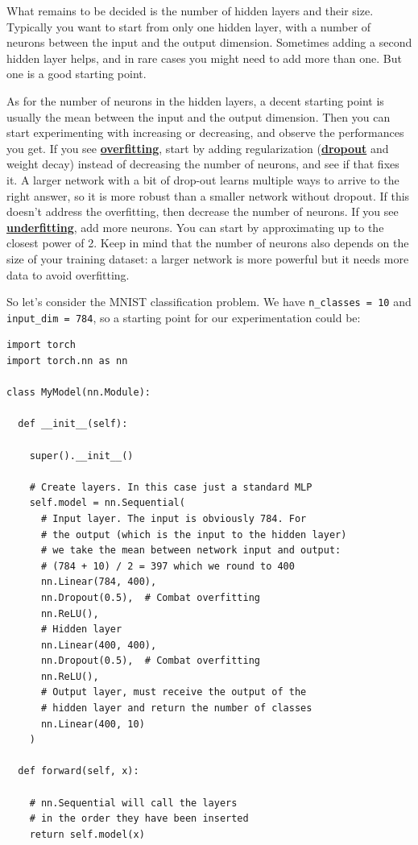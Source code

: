 What remains to be decided is the number of hidden layers and their size. Typically you want to start from only one hidden layer, with a number of neurons between the input and the output dimension. Sometimes adding a second hidden layer helps, and in rare cases you might need to add more than one. But one is a good starting point. \newline

As for the number of neurons in the hidden layers, a decent starting point is usually the mean between the input and the output dimension. Then you can start experimenting with increasing or decreasing, and observe the performances you get. If you see \href{https://en.wikipedia.org/wiki/Overfitting}{\textbf{overfitting}}, start by adding regularization (\href{https://pytorch.org/docs/stable/generated/torch.nn.Dropout.html}{\textbf{dropout}} and weight decay) instead of decreasing the number of neurons, and see if that fixes it. A larger network with a bit of drop-out learns multiple ways to arrive to the right answer, so it is more robust than a smaller network without dropout. If this doesn't address the overfitting, then decrease the number of neurons. If you see \href{https://en.wikipedia.org/wiki/Overfitting}{\textbf{underfitting}}, add more neurons. You can start by approximating up to the closest power of 2. Keep in mind that the number of neurons also depends on the size of your training dataset: a larger network is more powerful but it needs more data to avoid overfitting. \newline

So let's consider the MNIST classification problem. We have \verb|n_classes = 10| and \verb|input_dim = 784|, so a starting point for our experimentation could be:

\begin{lstlisting}
import torch
import torch.nn as nn

class MyModel(nn.Module):

  def __init__(self):

    super().__init__()

    # Create layers. In this case just a standard MLP
    self.model = nn.Sequential(
      # Input layer. The input is obviously 784. For
      # the output (which is the input to the hidden layer)
      # we take the mean between network input and output:
      # (784 + 10) / 2 = 397 which we round to 400
      nn.Linear(784, 400),
      nn.Dropout(0.5),  # Combat overfitting
      nn.ReLU(),
      # Hidden layer
      nn.Linear(400, 400),
      nn.Dropout(0.5),  # Combat overfitting
      nn.ReLU(),
      # Output layer, must receive the output of the
      # hidden layer and return the number of classes
      nn.Linear(400, 10)
    )

  def forward(self, x):

    # nn.Sequential will call the layers 
    # in the order they have been inserted
    return self.model(x)
\end{lstlisting}

